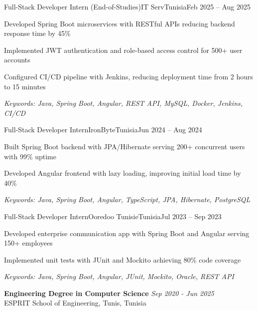 \documentclass[11pt,a4paper]{article}
\begin{document}
\makecvheader
\makecontactinfo


\begin{internship}{Full-Stack Developer Intern (End-of-Studies)}{IT Serv}{Tunisia}{Feb 2025 -- Aug 2025}{}
  \item Developed Spring Boot microservices with RESTful APIs reducing backend response time by 45\%
  \item Implemented JWT authentication and role-based access control for 500+ user accounts
  \item Configured CI/CD pipeline with Jenkins, reducing deployment time from 2 hours to 15 minutes
  \item[] \textit{\footnotesize Keywords: Java, Spring Boot, Angular, REST API, MySQL, Docker, Jenkins, CI/CD}
\end{internship}

\begin{internship}{Full-Stack Developer Intern}{IronByte}{Tunisia}{Jun 2024 -- Aug 2024}{}
  \item Built Spring Boot backend with JPA/Hibernate serving 200+ concurrent users with 99\% uptime
  \item Developed Angular frontend with lazy loading, improving initial load time by 40\%
  \item[] \textit{\footnotesize Keywords: Java, Spring Boot, Angular, TypeScript, JPA, Hibernate, PostgreSQL}
\end{internship}

\begin{internship}{Full-Stack Developer Intern}{Ooredoo Tunisie}{Tunisia}{Jul 2023 -- Sep 2023}{}
  \item Developed enterprise communication app with Spring Boot and Angular serving 150+ employees
  \item Implemented unit tests with JUnit and Mockito achieving 80\% code coverage
  \item[] \textit{\footnotesize Keywords: Java, Spring Boot, Angular, JUnit, Mockito, Oracle, REST API}
\end{internship}

\textbf{Engineering Degree in Computer Science} \hfill \textit{Sep 2020 - Jun 2025}\\[-2pt]
ESPRIT School of Engineering, Tunis, Tunisia
\end{document}
